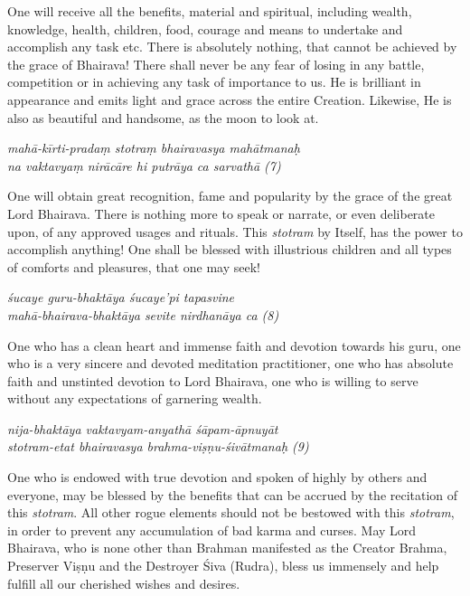 \documentclass[11pt,oneside,a4paper]{article}
\newenvironment{shloka}[1]
  {\bigskip\center#1\varwidth{\linewidth}}
  {\endvarwidth\endcenter\bigskip}
\newcommand{\tl}[1]{\emph{#1}}
\begin{document}
One will receive all the benefits, material and spiritual, including wealth,
knowledge, health, children, food, courage and means to undertake and accomplish
any task etc. There is absolutely nothing, that cannot be achieved by the grace
of Bhairava! There shall never be any fear of losing in any battle, competition
or in achieving any task of importance to us. He is brilliant in appearance and
emits light and grace across the entire Creation. Likewise, He is also as
beautiful and handsome, as the moon to look at.

\begin{shloka}\itshape
  mahā-kīrti-pradaṃ stotraṃ bhairavasya mahātmanaḥ\\
  na vaktavyaṃ nirācāre hi putrāya ca sarvathā (7)
\end{shloka}

One will obtain great recognition, fame and popularity by the grace of the great
Lord Bhairava. There is nothing more to speak or narrate, or even deliberate
upon, of any approved usages and rituals. This \tl{stotram} by Itself, has
the power to accomplish anything! One shall be blessed with illustrious children
and all types of comforts and pleasures, that one may seek!

\begin{shloka}\itshape
  śucaye guru-bhaktāya śucaye'pi tapasvine\\
  mahā-bhairava-bhaktāya sevite nirdhanāya ca (8)
\end{shloka}

One who has a clean heart and immense faith and devotion towards his guru,
one who is a very sincere and devoted meditation practitioner, one who has
absolute faith and unstinted devotion to Lord Bhairava, one who is willing to
serve without any expectations of garnering wealth.

\begin{shloka}\itshape
  nija-bhaktāya vaktavyam-anyathā śāpam-āpnuyāt\\
  stotram-etat bhairavasya brahma-viṣṇu-śivātmanaḥ (9)
\end{shloka}

One who is endowed with true devotion and spoken of highly by others and
everyone, may be blessed by the benefits that can be accrued by the recitation
of this \tl{stotram}. All other rogue elements should not be bestowed with this
\tl{stotram}, in order to prevent any accumulation of bad karma and curses.
May Lord Bhairava, who is none other than Brahman manifested as the Creator
Brahma, Preserver Viṣṇu and the Destroyer Śiva (Rudra), bless us immensely and
help fulfill all our cherished wishes and desires.
\end{document}
